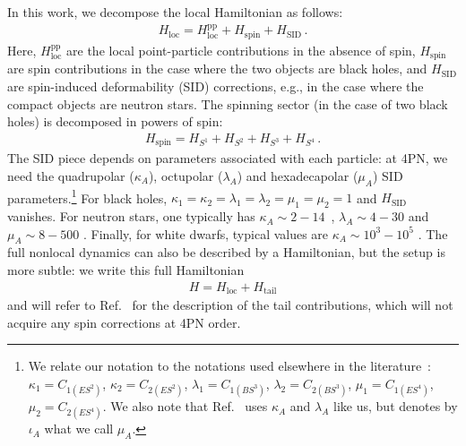 \documentclass[prd,superscriptaddress,preprintnumbers,tightenlines,nofootinbib, eqsecnum]{revtex4-2}
\begin{document}
%
In this work, we decompose the local Hamiltonian as follows:
\begin{align} \label{eq:local_Hamiltonian_decomposition_pp_spin_SID}
    H_\text{loc} = H_\text{loc}^\text{pp} + H_\text{spin} + H_\text{SID}\,.
\end{align}
Here, $H_\text{loc}^\text{pp}$ are the local point-particle contributions in the absence of spin, $H_\text{spin}$ are spin contributions in the case where the two objects are black holes, and $H_\text{SID}$ are spin-induced deformability (SID) corrections, e.g., in the case where the compact objects are neutron stars.
The spinning sector (in the case of two black holes) is decomposed in powers of spin:
\begin{align} \label{eq:spin_Hamiltonian_decomposition_S1234}
    H_\text{spin} = H_{S^1}+H_{S^2}+H_{S^3}+H_{S^4} \,.
\end{align}
The SID piece depends on parameters associated with each particle: at 4PN, we need the  quadrupolar ($\kappa_A$), octupolar  ($\lambda_A$) and hexadecapolar ($\mu_A$) SID
%
parameters.\footnote{
We relate our notation to the notations used elsewhere in the literature~\cite{Levi:2015msa}: $\kappa_1=C_{1(ES^2)}$, $\kappa_2=C_{2(ES^2)}$,  $\lambda_1=C_{1(BS^3)}$, $\lambda_2=C_{2(BS^3)}$, $\mu_1=C_{1(ES^4)}$, $\mu_2=C_{2(ES^4)}$. We also note that Ref.~\cite{Blanchet:2026wwa} uses $\kappa_A$ and $\lambda_A$ like us, but denotes by $\iota_A$ what we call $\mu_A$.}
%
For black holes, $\kappa_1 =\kappa_2 = \lambda_1 = \lambda_2= \mu_1=\mu_2  =1$ and $H_\text{SID}$ vanishes. For neutron stars, one typically has $\kappa_A \sim 2 - 14$~\cite{Rahman:2026qho,Laarakkers:1997hb,Pappas:2012qg, Harry:2018hke}, $\lambda_A \sim 4-30$ \cite{Saini:2023gaw} and $\mu_A \sim 8 - 500$ \cite{Yagi:2014bxa}. Finally, for white dwarfs, typical values are $\kappa_A \sim 10^3 - 10^5$ \cite{Rahman:2026qho, Taylor:2019hle}. 
%
The full nonlocal dynamics can also be described by a Hamiltonian, but the setup is more subtle: we write this full Hamiltonian
\begin{align} \label{eq:Hamiltonian_decomposition_loc_tail}
    H = H_\text{loc} + H_\text{tail}
\end{align}
and will refer to Ref.~\cite{Trestini:2025yyc} for the description of the tail contributions, which will not acquire any spin corrections at 4PN order.  
\end{document}
